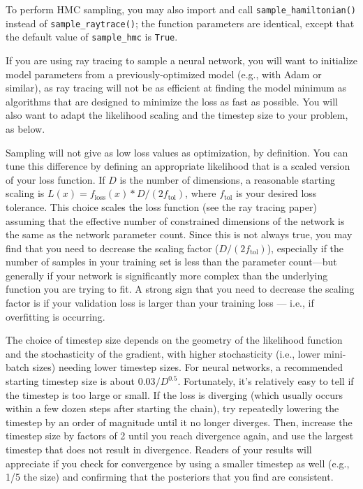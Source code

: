\documentclass[12pt]{article}
\begin{document}
To perform HMC sampling, you may also import and call \lstinline{sample_hamiltonian()} instead of \lstinline{sample_raytrace()}; the function parameters are identical, except that the default value of \lstinline{sample_hmc} is \lstinline{True}.

If you are using ray tracing to sample a neural network, you will want to initialize model parameters from a previously-optimized model (e.g., with Adam or similar), as ray tracing will not be as efficient at finding the model minimum as algorithms that are designed to minimize the loss as fast as possible.  You will also want to adapt the likelihood scaling and the timestep size to your problem, as below.

Sampling will not give as low loss values as optimization, by definition.  You can tune this difference by defining an appropriate likelihood that is a scaled version of your loss function.  If $D$ is the number of dimensions, a reasonable starting scaling is $L(x) = f_\mathrm{loss}(x) * D/(2 f_\mathrm{tol})$, where $f_\mathrm{tol}$ is your desired loss tolerance.  This choice scales the loss function (see the ray tracing paper) assuming that the effective number of constrained dimensions of the network is the same as the network parameter count.  Since this is not always true, you may find that you need to decrease the scaling factor ($D/(2 f_\mathrm{tol})$), especially if the number of samples in your training set is less than the parameter count---but generally if your network is significantly more complex than the underlying function you are trying to fit.  A strong sign that you need to decrease the scaling factor is if your validation loss is larger than your training loss --- i.e., if overfitting is occurring.

The choice of timestep size depends on the geometry of the likelihood function and the stochasticity of the gradient, with higher stochasticity (i.e., lower mini-batch sizes) needing lower timestep sizes.  For neural networks, a recommended starting timestep size is about $0.03/D^{0.5}$.  Fortunately, it's relatively easy to tell if the timestep is too large or small.  If the loss is diverging (which usually occurs within a few dozen steps after starting the chain), try repeatedly lowering the timestep by an order of magnitude until it no longer diverges.  Then, increase the timestep size by factors of 2 until you reach divergence again, and use the largest timestep that does not result in divergence.  Readers of your results will appreciate if you check for convergence by using a smaller timestep as well (e.g., 1/5 the size) and confirming that the posteriors that you find are consistent.
\end{document}

